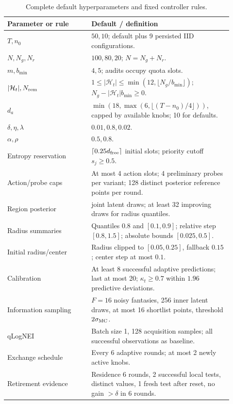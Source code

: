 \begin{table}[htbp]
\caption{Complete default hyperparameters and fixed controller rules.}
\label{tab:ct-settings}\label{tab:ct-rules}
\centering\small
\begin{tabular}{>{\raggedright\arraybackslash}p{0.34\linewidth}>{\raggedright\arraybackslash}p{0.58\linewidth}}
\toprule
Parameter or rule & Default / definition \\
\midrule
$T,n_0$ & $50,10$; default plus 9 persisted IID configurations. \\
$N,N_g,N_r$ & $100,80,20$; $N=N_g+N_r$. \\
$m,b_{\min}$ & $4,5$; audits occupy quota slots. \\
$|\mathcal H_t|,N_{\rm rem}$ & $1\leq|\mathcal H_t|\leq\min(12,\lfloor N_g/b_{\min}\rfloor)$; $N_g-|\mathcal H_t|b_{\min}\geq0$. \\
$d_a$ & $\min(18,\max(6,\lfloor(T-n_0)/4\rfloor))$, capped by available knobs; 10 for defaults. \\
$\delta,\eta,\lambda$ & $0.01,0.8,0.02$. \\
$\alpha,\rho$ & $0.5,0.8$. \\
Entropy reservation & $\lceil0.25d_{\rm free}\rceil$ initial slots; priority cutoff $s_j\geq0.5$. \\
Action/probe caps & At most 4 action slots; 4 preliminary probes per variant; 128 distinct posterior reference points per round. \\
Region posterior & 256 joint latent draws; at least 32 improving draws for radius quantiles. \\
Radius summaries & Quantiles $0.8$ and $[0.1,0.9]$; relative step $[0.8,1.5]$; absolute bounds $[0.025,0.5]$. \\
Initial radius/center & Radius clipped to $[0.05,0.25]$, fallback $0.15$; center step at most $0.1$. \\
Calibration & At least 8 successful adaptive predictions; last at most 20; $\kappa_t\geq0.7$ within $1.96$ predictive deviations. \\
Information sampling & $F=16$ noisy fantasies, 256 inner latent draws, at most 16 shortlist points, threshold $2\sigma_{\rm MC}$. \\
qLogNEI & Batch size 1, 128 acquisition samples; all successful observations as baseline. \\
Exchange schedule & Every 6 adaptive rounds; at most 2 newly active knobs. \\
Retirement evidence & Residence 6 rounds, 2 successful local tests, distinct values, 1 fresh test after reset, no gain $>\delta$ in 6 rounds. \\

\end{tabular}
\end{table}
